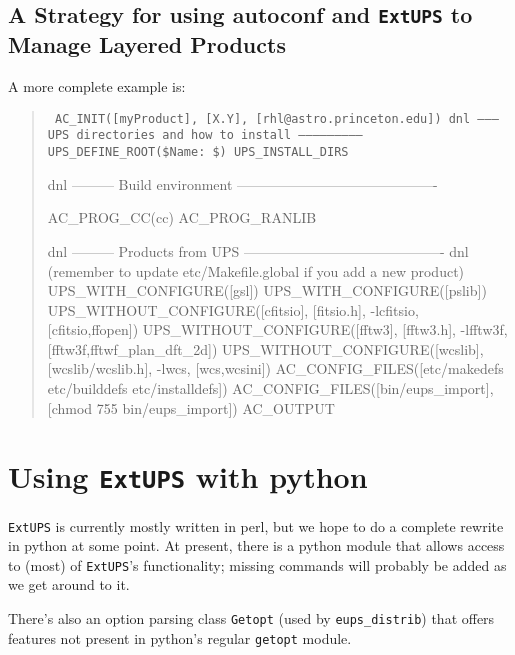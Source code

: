\documentclass{article}
\newcommand{\code}[1]{\texttt{#1}}
\newcommand{\eups}{\code{ExtUPS}}
\begin{document}
\subsection{A Strategy for using autoconf and \eups{} to Manage Layered Products}


A more complete example is:

\begin{quote}
    \obeylines\tt\small\parskip=0pt
AC\_INIT([myProduct], [X.Y], [rhl@astro.princeton.edu])
\vspace{5pt}
dnl --------- UPS directories and how to install --------------------------
\vspace{5pt}
UPS\_DEFINE\_ROOT(\${Name}:  \$)
UPS\_INSTALL\_DIRS   
\vspace{5pt}

dnl --------- Build environment -------------------------------------------

AC\_PROG\_CC(cc)
AC\_PROG\_RANLIB

dnl --------- Products from UPS -------------------------------------------
dnl (remember to update etc/Makefile.global if you add a new product)
\vspace{5pt}
UPS\_WITH\_CONFIGURE([gsl])
UPS\_WITH\_CONFIGURE([pslib])
\vspace{5pt}
UPS\_WITHOUT\_CONFIGURE([cfitsio], [fitsio.h],
                        -lcfitsio, [cfitsio,ffopen])
UPS\_WITHOUT\_CONFIGURE([fftw3],   [fftw3.h],
                        -lfftw3f,  [fftw3f,fftwf\_plan\_dft\_2d])
UPS\_WITHOUT\_CONFIGURE([wcslib],  [wcslib/wcslib.h],
                        -lwcs,     [wcs,wcsini])
\vspace{5pt}
AC\_CONFIG\_FILES([etc/makedefs etc/builddefs etc/installdefs])
AC\_CONFIG\_FILES([bin/eups\_import], [chmod 755 bin/eups\_import])
\vspace{5pt}
AC\_OUTPUT
\end{quote}

\section{Using \eups{} with python}

\eups{} is currently mostly written in perl, but we hope to do a
complete rewrite in python at some point.  At present, there is a
python module that allows access to (most) of \eups's functionality;
missing commands will probably be added as we get around to it.

There's also an option parsing class \code{Getopt} (used by \code{eups\_distrib}) that
offers features not present in python's regular \code{getopt} module.
\end{document}
